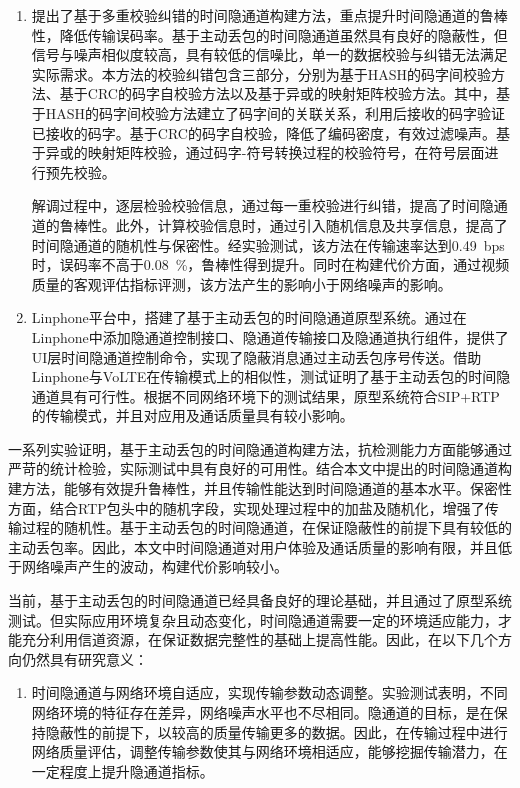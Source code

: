 \begin{conclusion}
\begin{enumerate}
    \item
    提出了基于多重校验纠错的时间隐通道构建方法，重点提升时间隐通道的鲁棒性，降低传输误码率。基于主动丢包的时间隐通道虽然具有良好的隐蔽性，但信号与噪声相似度较高，具有较低的信噪比，单一的数据校验与纠错无法满足实际需求。本方法的校验纠错包含三部分，分别为基于HASH的码字间校验方法、基于CRC的码字自校验方法以及基于异或的映射矩阵校验方法。其中，基于HASH的码字间校验方法建立了码字间的关联关系，利用后接收的码字验证已接收的码字。基于CRC的码字自校验，降低了编码密度，有效过滤噪声。基于异或的映射矩阵校验，通过码字-符号转换过程的校验符号，在符号层面进行预先校验。
    
    解调过程中，逐层检验校验信息，通过每一重校验进行纠错，提高了时间隐通道的鲁棒性。此外，计算校验信息时，通过引入随机信息及共享信息，提高了时间隐通道的随机性与保密性。经实验测试，该方法在传输速率达到{0.49\ bps}时，误码率不高于{0.08\ \%}，鲁棒性得到提升。同时在构建代价方面，通过视频质量的客观评估指标评测，该方法产生的影响小于网络噪声的影响。

    \item
    Linphone平台中，搭建了基于主动丢包的时间隐通道原型系统。通过在Linphone中添加隐通道控制接口、隐通道传输接口及隐通道执行组件，提供了UI层时间隐通道控制命令，实现了隐蔽消息通过主动丢包序号传送。借助Linphone与VoLTE在传输模式上的相似性，测试证明了基于主动丢包的时间隐通道具有可行性。根据不同网络环境下的测试结果，原型系统符合SIP+RTP的传输模式，并且对应用及通话质量具有较小影响。
\end{enumerate}

一系列实验证明，基于主动丢包的时间隐通道构建方法，抗检测能力方面能够通过严苛的统计检验，实际测试中具有良好的可用性。结合本文中提出的时间隐通道构建方法，能够有效提升鲁棒性，并且传输性能达到时间隐通道的基本水平。保密性方面，结合RTP包头中的随机字段，实现处理过程中的加盐及随机化，增强了传输过程的随机性。基于主动丢包的时间隐通道，在保证隐蔽性的前提下具有较低的主动丢包率。因此，本文中时间隐通道对用户体验及通话质量的影响有限，并且低于网络噪声产生的波动，构建代价影响较小。

当前，基于主动丢包的时间隐通道已经具备良好的理论基础，并且通过了原型系统测试。但实际应用环境复杂且动态变化，时间隐通道需要一定的环境适应能力，才能充分利用信道资源，在保证数据完整性的基础上提高性能。因此，在以下几个方向仍然具有研究意义：
\begin{enumerate}
    \item
    时间隐通道与网络环境自适应，实现传输参数动态调整。实验测试表明，不同网络环境的特征存在差异，网络噪声水平也不尽相同。隐通道的目标，是在保持隐蔽性的前提下，以较高的质量传输更多的数据。因此，在传输过程中进行网络质量评估，调整传输参数使其与网络环境相适应，能够挖掘传输潜力，在一定程度上提升隐通道指标。
    

\end{enumerate}
\end{conclusion}

